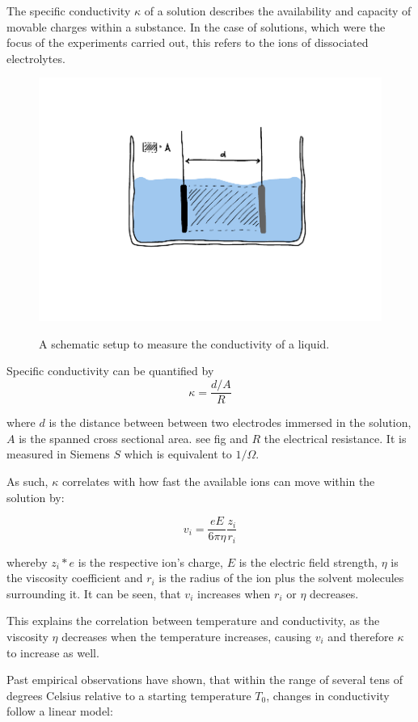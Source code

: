 
The specific conductivity $\kappa$ of a solution describes the availability and capacity of movable charges within a substance. In the case of solutions, which were the focus of the experiments carried out, this refers to the ions of dissociated electrolytes. 

\begin{figure}[H]
    \centering
    \includegraphics[width=.4\textwidth]{figures/Kappa.pdf}
    \label{fig:sketch_measuring}
    \caption{A schematic setup to measure the conductivity of a liquid.}
\end{figure}


Specific conductivity can be quantified by
\begin{equation} \label{eq:7.5}
    \kappa = \frac{d / A}{R}
\end{equation}

where $d$ is the distance between between two electrodes immersed in the solution, $A$ is the spanned cross sectional area. see fig and $R$ the electrical resistance. It is measured in Siemens $S$ which is equivalent to $1 / \Omega$.

As such, $\kappa$ correlates with how fast the available ions can move within the solution by: %

\begin{equation} \label{eq:7.4}
    v_i = \frac{e E}{6 \pi \eta} \frac{z_i}{r_i}
\end{equation}

whereby $z_i * e$ is the respective ion's charge, $E$ is the electric field strength, $\eta$ is the viscosity coefficient and $r_i$ is the radius of the ion plus the solvent molecules surrounding it. It can be seen, that $v_i$ increases when $r_i$ or $\eta$ decreases.

This explains the correlation between temperature and conductivity, as the viscosity $\eta$ decreases when the temperature increases, causing $v_i$ and therefore $\kappa$ to increase as well.

Past empirical observations have shown, that within the range of several tens of degrees Celsius relative to a starting temperature $T_0$, changes in conductivity follow a linear model:

